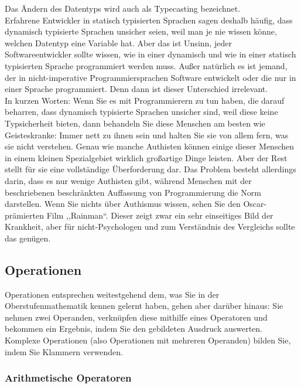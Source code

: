 Das Ändern des Datentyps wird auch als Typecasting bezeichnet.\\

Erfahrene Entwickler in statisch typisierten Sprachen sagen deshalb häufig, dass dynamisch typisierte Sprachen unsicher seien, weil man je nie wissen könne, welchen Datentyp eine Variable hat. Aber das ist Unsinn, jeder Softwareentwickler sollte wissen, wie in einer dynamisch und wie in einer statisch typisierten Sprache programmiert werden muss. Außer natürlich es ist jemand, der in nicht-imperative Programmiersprachen Software entwickelt oder die nur in einer Sprache programmiert. Denn dann ist dieser Unterschied irrelevant.\\

In kurzen Worten: Wenn Sie es mit Programmierern zu tun haben, die darauf beharren, dass dynamisch typisierte Sprachen unsicher sind, weil diese keine Typsicherheit bieten, dann behandeln Sie diese Menschen am besten wie Geisteskranke: Immer nett zu ihnen sein und halten Sie sie von allem fern, was sie nicht verstehen. Genau wie manche Authisten können einige dieser Menschen in einem kleinen Spezialgebiet wirklich großartige Dinge leisten. Aber der Rest stellt für sie eine vollständige Überforderung dar. Das Problem besteht allerdings darin, dass es nur wenige Authisten gibt, während Menschen mit der beschriebenen beschränkten Auffassung von Programmierung die Norm darstellen. Wenn Sie nichts über Authismus wissen, sehen Sie den Oscar-prämierten Film ,,Rainman``. Dieser zeigt zwar ein sehr einseitiges Bild der Krankheit, aber für nicht-Psychologen und zum Verständnis des Vergleichs sollte das genügen.

\subsection{Operationen}

Operationen entsprechen weitestgehend dem, was Sie in der Oberstufenmathematik kennen gelernt haben, gehen aber darüber hinaus: Sie nehmen zwei Operanden, verknüpfen diese mithilfe eines Operatoren und bekommen ein Ergebnis, indem Sie den gebildeten Ausdruck auswerten. Komplexe Operationen (also Operationen mit mehreren Operanden) bilden Sie, indem Sie Klammern verwenden.

\subsubsection{Arithmetische Operatoren}

